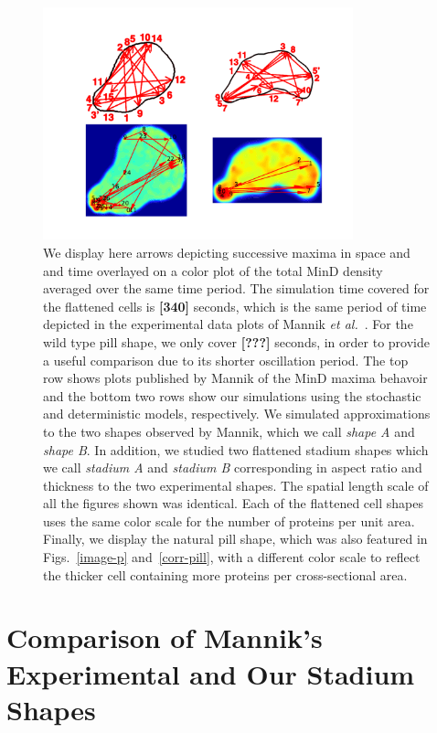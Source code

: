 \documentclass[letterpaper,twocolumn,amsmath,amssymb,pre]{revtex4-1}
\newcommand{\red}[1]{{\bf \color{red} #1}}
\newcommand{\fixme}[1]{\red{[#1]}}
\begin{document}
\begin{figure}
  \centering
  \includegraphics[width=0.8\textwidth]{../paper/plot-ave}
  \caption{We display here arrows depicting successive maxima in space
    and and time overlayed on a color plot of the total MinD density
    averaged over the same time period.  The simulation time covered
    for the flattened cells is \fixme{340} seconds, which is the same
    period of time depicted in the experimental data plots of Mannik
    \emph{et al.}~\cite{mannik2012robustness}.  For the wild type pill
    shape, we only cover \fixme{???} seconds, in order to provide a
    useful comparison due to its shorter oscillation period.  The top
    row shows plots published by Mannik of the MinD maxima behavoir
    and the bottom two rows show our simulations using the stochastic
    and deterministic models, respectively.  We simulated
    approximations to the two shapes observed by Mannik, which we call
    \emph{shape A} and \emph{shape B}.  In addition, we studied two
    flattened stadium shapes which we call \emph{stadium A} and
    \emph{stadium B} corresponding in aspect ratio and thickness to
    the two experimental shapes.  The spatial length scale of all the
    figures shown was identical. Each of the flattened cell shapes
    uses the same color scale for the number of proteins per unit
    area.  Finally, we display the natural pill shape, which was also
    featured in Figs.~\ref{image-p} and~\ref{corr-pill}, with a
    different color scale to reflect the thicker cell containing more
    proteins per cross-sectional area.  }
  \label{randst-plot-ave}
\end{figure}

\section{Comparison of Mannik's Experimental and Our Stadium Shapes}
\end{document}
